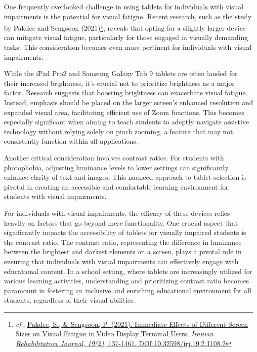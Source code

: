 \documentclass[14pt,letterpaper,twoside]{extreport}
\begin{document}
One frequently overlooked challenge in using tablets for individuals with visual impairments is the potential for visual fatigue. Recent research, such as the study by Pakdee and Sengsoon (2021)\footnote{\textit{cf}., \href{https://www.researchgate.net/publication/352764109_Immediate_Effects_of_Different_Screen_Sizes_on_Visual_Fatigue_in_Video_Display_Terminal_Users}{Pakdee, S., \& Sengsoon, P. (2021). Immediate Effects of Different Screen Sizes on Visual Fatigue in Video Display Terminal Users. \textit{Iranian Rehabilitation Journal, 19(2)}, 137-1461. DOI:10.32598/irj.19.2.1108.2}}, reveals that opting for a slightly larger device can mitigate visual fatigue, particularly for those engaged in visually demanding tasks. This consideration becomes even more pertinent for individuals with visual impairments.

While the iPad Pro2 and Samsung Galaxy Tab 9 tablets are often lauded for their increased brightness, it's crucial not to prioritize brightness as a major factor. Research suggests that boosting brightness can exacerbate visual fatigue. Instead, emphasis should be placed on the larger screen's enhanced resolution and expanded visual area, facilitating efficient use of Zoom functions. This becomes especially significant when aiming to teach students to adeptly navigate assistive technology without relying solely on pinch zooming, a feature that may not consistently function within all applications.

Another critical consideration involves contrast ratios. For students with photophobia, adjusting luminance levels to lower settings can significantly enhance clarity of text and images. This nuanced approach to tablet selection is pivotal in creating an accessible and comfortable learning environment for students with visual impairments.

For individuals with visual impairments, the efficacy of these devices relies heavily on factors that go beyond mere functionality. One crucial aspect that significantly impacts the accessibility of tablets for visually impaired students is the contrast ratio. The contrast ratio, representing the difference in luminance between the brightest and darkest elements on a screen, plays a pivotal role in ensuring that individuals with visual impairments can effectively engage with educational content. In a school setting, where tablets are increasingly utilized for various learning activities, understanding and prioritizing contrast ratio becomes paramount in fostering an inclusive and enriching educational environment for all students, regardless of their visual abilities. 
\end{document}
